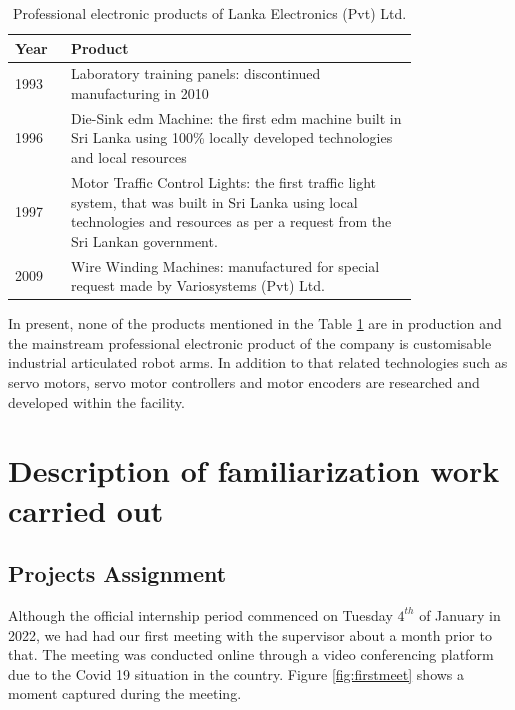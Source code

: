 \documentclass[a4paper,12pt]{report}%
\begin{document}
\begin{table}[h]
	\captionsetup{font=sc, labelsep=newline}
	\centering
	\caption{Professional electronic products of Lanka Electronics (Pvt) Ltd.}
	\begin{tabular}{|p{0.1\linewidth}  |p{0.7\linewidth}  |}
		\hline
		\textbf{Year} & \textbf{Product}\\\hline
		1993 & Laboratory training panels: discontinued manufacturing in 2010\\\hline
		1996 & Die-Sink \ac{edm} Machine: the first \ac{edm} machine built in Sri Lanka using 100\% locally developed technologies and local resources\\\hline
		1997& Motor Traffic Control Lights: the first traffic light system, that was built in Sri Lanka using local technologies and resources as per a request from the Sri Lankan government.\\\hline
		2009& Wire Winding Machines: manufactured for special request made by Variosystems (Pvt) Ltd.\\
		
		\hline
	\end{tabular}
	\label{table:pastproducts}
\end{table}

In present, none of the products mentioned in the Table \ref{table:pastproducts} are in production and the mainstream professional electronic product of the company is customisable industrial articulated robot arms. In addition to that related technologies such as servo motors, servo motor controllers and motor encoders  are researched and developed within the facility.

\chapter{Description of familiarization work carried out}
\section{Projects Assignment}

Although the official internship period commenced on Tuesday $4^{th}$ of January in 2022, we had had our first meeting with the supervisor about a month prior to that. The meeting was conducted online through a video conferencing platform due to the Covid 19 situation in the country. Figure \ref{fig:firstmeet} shows a moment captured during the meeting.
\end{document}
